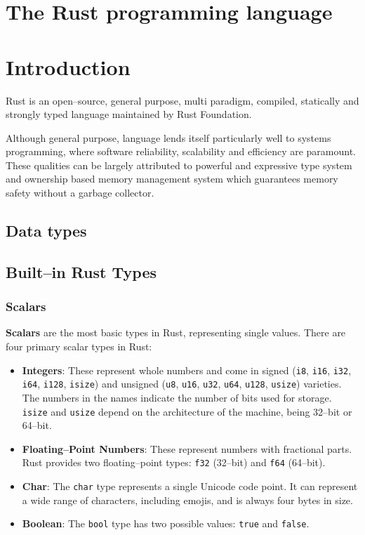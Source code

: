 
\chapter{The Rust programming language}

\chapter*{Introduction}

Rust is an open--source, general purpose, multi paradigm, compiled, statically and strongly typed language maintained by Rust Foundation.

Although general purpose, language lends itself particularly well to systems programming, where software reliability, scalability and efficiency are paramount.
These qualities can be largely attributed to powerful and expressive type system and ownership based memory management system which guarantees memory safety without a garbage collector.

\section{Data types}

\section*{Built--in Rust Types}

\subsection{Scalars}
\textbf{Scalars} are the most basic types in Rust, representing single values. There are four primary scalar types in Rust:

\begin{itemize}
    \item \textbf{Integers}: These represent whole numbers and come in signed (\texttt{i8}, \texttt{i16}, \texttt{i32}, \texttt{i64}, \texttt{i128}, \texttt{isize}) 
    and unsigned (\texttt{u8}, \texttt{u16}, \texttt{u32}, \texttt{u64}, \texttt{u128}, \texttt{usize}) varieties. 
    The numbers in the names indicate the number of bits used for storage. \texttt{isize} and \texttt{usize} depend on the architecture of the machine, being 32--bit or 64--bit.
    
    \item \textbf{Floating--Point Numbers}: These represent numbers with fractional parts. Rust provides two floating--point types: \texttt{f32} (32--bit) and \texttt{f64} (64--bit).
    
    \item \textbf{Char}: The \texttt{char} type represents a single Unicode code point. It can represent a wide range of characters, including emojis, and is always four bytes in size.
    
    \item \textbf{Boolean}: The \texttt{bool} type has two possible values: \texttt{true} and \texttt{false}.
\end{itemize}

